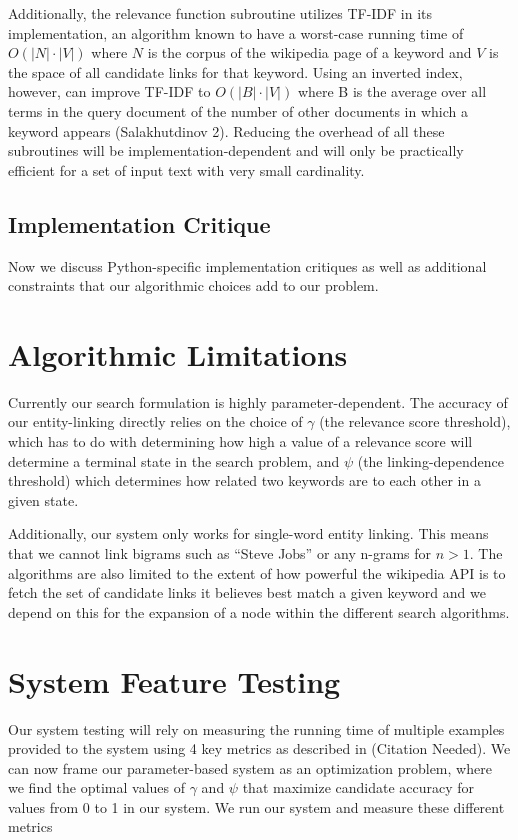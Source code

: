 \documentclass[twoside,11pt]{article}
\begin{document}
Additionally, the relevance function subroutine utilizes TF-IDF in its implementation, an algorithm known to have a worst-case running time of $O(|N|\cdot|V|)$ where $N$ is the corpus of the wikipedia page of a keyword and $V$ is the space of all candidate links for that keyword. Using an inverted index, however, can improve TF-IDF to $O(|B|\cdot|V|)$ where B is the average over all terms in the query document of the number of other documents
in which a keyword appears (Salakhutdinov 2). Reducing the overhead of all these subroutines will be implementation-dependent and will only be practically efficient for a set of input text with very small cardinality.

\subsection{Implementation Critique}
Now we discuss Python-specific implementation critiques as well as additional constraints that our algorithmic choices add to our problem.
\section{Algorithmic Limitations}
Currently our search formulation is highly parameter-dependent. The accuracy of our entity-linking directly relies on the choice of $\gamma$ (the relevance score threshold), which has to do with determining how high a value of a relevance score will determine a terminal state in the search problem, and $\psi$ (the linking-dependence threshold) which determines how related two keywords are to each other in a given state.

Additionally, our system only works for single-word entity linking. This means that we cannot link bigrams such as ``Steve Jobs'' or any n-grams for $n > 1$. The algorithms are also limited to the extent of how powerful the wikipedia API is to fetch the set of candidate links it believes best match a given keyword and we depend on this for the expansion of a node within the different search algorithms.

\section{System Feature Testing}

Our system testing will rely on measuring the running time of multiple examples provided to the system using 4 key metrics as described in (Citation Needed). We can now frame our parameter-based system as an optimization problem, where we find the optimal values of $\gamma$ and $\psi$ that maximize candidate accuracy for values from 0 to 1 in our system. We run our system and measure these different metrics 
\end{document}
